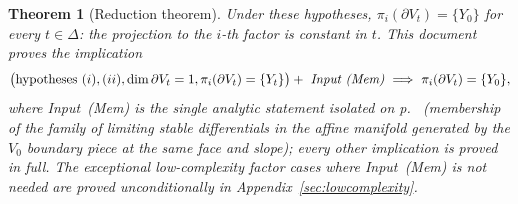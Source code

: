 \documentclass[11pt]{article}
\newtheorem{thm}{Theorem}[section]
\theoremstyle{definition}
\theoremstyle{remark}
\begin{document}
\begin{thm}[Reduction theorem]\label{thm:main}
Under these hypotheses, $\pi_i(\partial V_t) = \{Y_0\}$ for every
$t \in \Delta$: the projection to the $i$-th factor is constant in
$t$. \emph{This document proves the implication}
\[
\bigl(\text{hypotheses } (i), (ii), \dim\partial V_t = 1,
\pi_i(\partial V_t) = \{Y_t\}\bigr)
+\ \emph{Input~(Mem)}
\ \Longrightarrow\ \pi_i(\partial V_t) = \{Y_0\} ,
\]
where \emph{Input~(Mem)} is the single analytic statement isolated on
p.\ \pageref{input:membership} (membership of the family of limiting
stable differentials in the affine manifold generated by the $V_0$
boundary piece at the same face and slope); every other implication is
proved in full. The exceptional low-complexity factor cases where
Input~(Mem) is not needed are proved unconditionally in
Appendix~\ref{sec:lowcomplexity}.
\end{thm}
\end{document}
